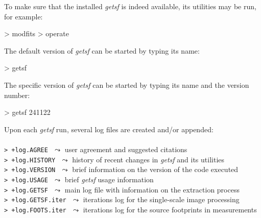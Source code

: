 \documentclass[a4paper,10pt]{article}
\begin{document}
To make sure that the installed \textsl{getsf} is indeed available, its utilities may be run, for example:
\begin{verbnobox}[\mbox{}\small] 
> modfits
> operate
\end{verbnobox} 
The default version of \textsl{getsf} can be started by typing its name:
\begin{verbnobox}[\mbox{}\small] 
> getsf
\end{verbnobox} 
The specific version of \textsl{getsf} can be started by typing its name and the version number:
\begin{verbnobox}[\mbox{}\small] 
> getsf 241122
\end{verbnobox} 
Upon each \textsl{getsf} run, several log files are created and/or appended:\\
\vspace{-2mm}\noindent\\
{\small\verb!> +log.AGREE!} $\,\,\leadsto$ user agreement and suggested citations\\
{\small\verb!> +log.HISTORY!} $\,\,\leadsto$ history of recent changes in \textsl{getsf} and its utilities\\
{\small\verb!> +log.VERSION!} $\,\,\leadsto$ brief information on the version of the code executed\\
{\small\verb!> +log.USAGE!} $\,\,\leadsto$ brief \textsl{getsf} usage information\\
{\small\verb!> +log.GETSF!} $\,\,\leadsto$ main log file with information on the extraction process\\
{\small\verb!> +log.GETSF.iter!} $\,\,\leadsto$ iterations log for the single-scale image processing\\
{\small\verb!> +log.FOOTS.iter!\vspace{-2mm}} $\,\,\leadsto$ iterations log for the source footprints in measurements\\\\
\end{document}
